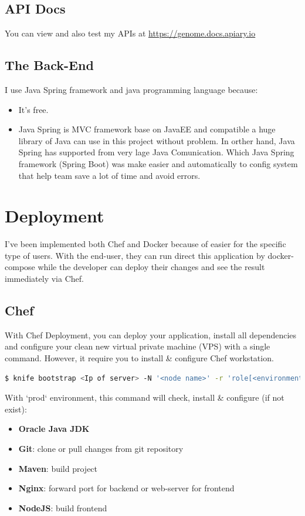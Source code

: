 \documentclass[a4paper,12pt]{article}
\begin{document}
\subsection{API Docs}
You can view and also test my APIs at \url{https://genome.docs.apiary.io}

\subsection{The Back-End}
I use Java Spring framework and java programming language because:
\begin{itemize}
	\item It's free.
	\item Java Spring is MVC framework base on JavaEE and compatible a huge library of Java can use in this project without problem. In orther hand, Java Spring has supported from very lage Java Comunication. Which Java Spring framework (Spring Boot) was make easier and automatically to config system that help team save a lot of time and avoid errors.
\end{itemize}

\section{Deployment}
I've been implemented both Chef and Docker because of easier for the specific type of users.  With the end-user, they can run direct this application by docker-compose while the developer can deploy their changes and see the result immediately via Chef.
\subsection{Chef}
With Chef Deployment, you can deploy your application, install all dependencies and  configure your clean new virtual private machine (VPS) with a single command. However, it require you to install \& configure Chef workstation. 
\\
\begin{lstlisting}[language=bash]
  $ knife bootstrap <Ip of server> -N '<node name>' -r 'role[<environment>]' --ssh-user <user name on node> --sudo --ssh-identity-file <ssh private credential> --secret-file <location of secret file>
\end{lstlisting}

With `prod` environment, this command will check, install \& configure (if not exist):
\begin{itemize}
	\item \textbf{Oracle Java JDK}
	\item \textbf{Git}: clone or pull changes from git repository
	\item \textbf{Maven}: build project
	\item \textbf{Nginx}: forward port for backend or web-server for frontend
	\item \textbf{NodeJS}: build frontend
\end{itemize}
\end{document}
